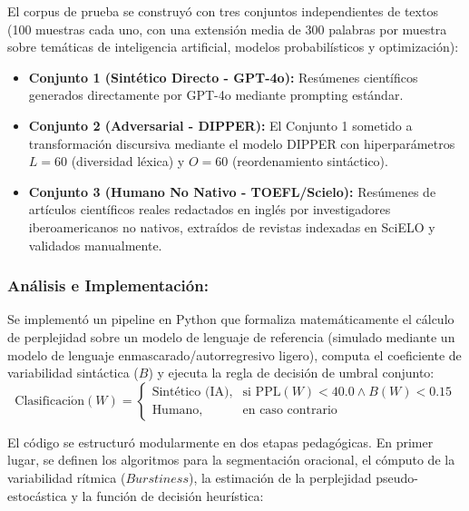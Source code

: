 El corpus de prueba se construyó con tres conjuntos independientes de textos (100 muestras cada uno, con una extensión media de 300 palabras por muestra sobre temáticas de inteligencia artificial, modelos probabilísticos y optimización):
\begin{itemize}
    \item \textbf{Conjunto 1 (Sintético Directo - GPT-4o):} Resúmenes científicos generados directamente por GPT-4o mediante prompting estándar.
    \item \textbf{Conjunto 2 (Adversarial - DIPPER):} El Conjunto 1 sometido a transformación discursiva mediante el modelo DIPPER con hiperparámetros $L=60$ (diversidad léxica) y $O=60$ (reordenamiento sintáctico).
    \item \textbf{Conjunto 3 (Humano No Nativo - TOEFL/Scielo):} Resúmenes de artículos científicos reales redactados en inglés por investigadores iberoamericanos no nativos, extraídos de revistas indexadas en SciELO y validados manualmente.
\end{itemize}

\subsubsection*{Análisis e Implementación:}
Se implementó un pipeline en Python que formaliza matemáticamente el cálculo de perplejidad sobre un modelo de lenguaje de referencia (simulado mediante un modelo de lenguaje enmascarado/autorregresivo ligero), computa el coeficiente de variabilidad sintáctica ($B$) y ejecuta la regla de decisión de umbral conjunto:
\begin{equation}
\mathrm{Clasificaci\acute{o}n}(W) = \left\{ \begin{array}{ll} \mbox{Sintético (IA)}, & \mbox{si } \mathrm{PPL}(W) < 40.0 \land B(W) < 0.15 \\ \mbox{Humano}, & \mbox{en caso contrario} \end{array} \right.
\end{equation}

El código se estructuró modularmente en dos etapas pedagógicas. En primer lugar, se definen los algoritmos para la segmentación oracional, el cómputo de la variabilidad rítmica ($Burstiness$), la estimación de la perplejidad pseudo-estocástica y la función de decisión heurística:

